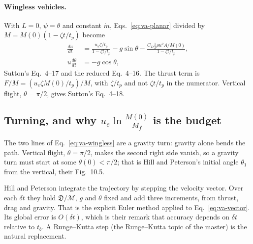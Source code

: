 \paragraph{Wingless vehicles.} With $L=0$, $\psi=\theta$ and constant
$\dot m$, Eqs.~\ref{eq:va-planar} divided by $M=M(0)(1-\zeta t/t_p)$ become
\begin{equation}\label{eq:va-wingless}
\begin{aligned}
 \frac{du}{dt}
 &=\frac{u_e\zeta/t_p}{1-\zeta t/t_p}-g\sin\theta
  -\frac{C_D\tfrac12\rho u^2A/M(0)}{1-\zeta t/t_p},\\
 u\frac{d\theta}{dt}&=-g\cos\theta ,
\end{aligned}
\end{equation}
Sutton's Eq.~4--17 and the reduced Eq.~4--16. The thrust term is
$F/M=(u_e\zeta M(0)/t_p)/M$, with $\zeta/t_p$ and not $\zeta t/t_p$ in the
numerator. Vertical flight, $\theta=\pi/2$, gives Sutton's Eq.~4--18.

\subsection{Turning, and why \texorpdfstring{$u_e\ln\frac{M(0)}{M_f}$}{u_e ln(M(0)/M_f)} is the budget}
\label{sec:va-budget}
The two lines of Eq.~\ref{eq:va-wingless} are a gravity turn: gravity alone
bends the path. Vertical flight, $\theta=\pi/2$, makes the second right side
vanish, so a gravity turn must start at some $\theta(0)<\pi/2$; that is Hill
and Peterson's initial angle $\theta_1$ from the vertical, their Fig.~10.5.

Hill and Peterson integrate the trajectory by stepping the velocity vector.
Over each $\delta t$ they hold $\mathfrak D/\mathcal M$, $g$ and $\theta$
fixed and add three increments, from thrust, drag and gravity. That is the
explicit Euler method applied to Eq.~\ref{eq:va-vector}. Its global error is
$O(\delta t)$, which is their remark that accuracy depends on $\delta t$
relative to $t_b$. A Runge--Kutta step (the Runge--Kutta topic of the master)
is the natural replacement.

